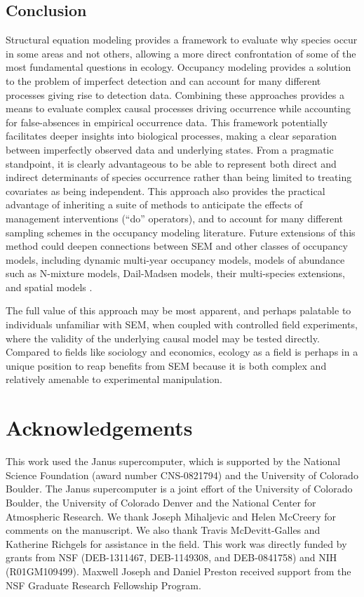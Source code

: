 \subsection{Conclusion}

Structural equation modeling provides a framework to evaluate why
species occur in some areas and not others, allowing a more direct
confrontation of some of the most fundamental questions in ecology.
Occupancy modeling provides a solution to the problem of imperfect
detection and can account for many different processes giving rise to
detection data. Combining these approaches provides a means to evaluate
complex causal processes driving occurrence while accounting for
false-absences in empirical occurrence data. This framework potentially
facilitates deeper insights into biological processes, making a clear
separation between imperfectly observed data and underlying states. From
a pragmatic standpoint, it is clearly advantageous to be able to
represent both direct and indirect determinants of species occurrence
rather than being limited to treating covariates as being independent.
This approach also provides the practical advantage of inheriting a
suite of methods to anticipate the effects of management interventions
(``do'' operators), and to account for many different sampling schemes
in the occupancy modeling literature. Future extensions of this method
could deepen connections between SEM and other classes of occupancy
models, including dynamic multi-year occupancy models, models of
abundance such as N-mixture models, Dail-Madsen models, their
multi-species extensions, and spatial models \citep{Royle2004, Royle2007, Dail2011, Lamb2014, Dorazio2014}.

The full value of this approach may be most apparent, and perhaps
palatable to individuals unfamiliar with SEM, when coupled with
controlled field experiments, where the validity of the underlying
causal model may be tested directly. Compared to fields like sociology
and economics, ecology as a field is perhaps in a unique position to
reap benefits from SEM because it is both complex and relatively
amenable to experimental manipulation.

\section{Acknowledgements}

This work used the Janus supercomputer, which is supported by the
National Science Foundation (award number CNS-0821794) and the
University of Colorado Boulder. The Janus supercomputer is a joint
effort of the University of Colorado Boulder, the University of Colorado
Denver and the National Center for Atmospheric Research. We thank Joseph
Mihaljevic and Helen McCreery for comments on the manuscript. We also
thank Travis McDevitt-Galles and Katherine Richgels for assistance in
the field. This work was directly funded by grants from NSF
(DEB-1311467, DEB-1149308, and DEB-0841758) and NIH (R01GM109499).
Maxwell Joseph and Daniel Preston received support from the NSF Graduate
Research Fellowship Program.

